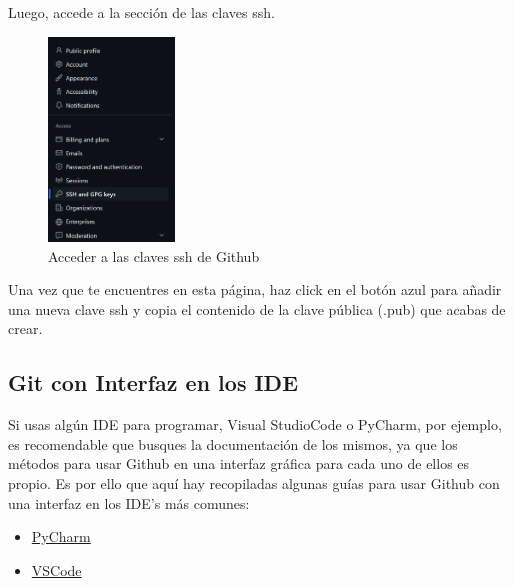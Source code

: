 \documentclass[]{article}
\begin{document}
\begin{enumerate}
    Luego, accede a la sección de las claves ssh.
    \begin{figure}[H]
        \centering
        \includegraphics[width=0.3\textwidth]{./static/github_2.png}
        \caption{Acceder a las claves ssh de Github}
    \end{figure}

    Una vez que te encuentres en esta página, haz click en el botón azul para añadir una nueva clave ssh y copia el contenido de la clave pública (.pub) que acabas de crear.
\end{enumerate}

\subsection{Git con Interfaz en los IDE}
Si usas algún IDE para programar, Visual StudioCode o PyCharm, por ejemplo, es recomendable que busques la documentación de los mismos, ya que los métodos para usar Github en una interfaz gráfica para cada uno de ellos es propio. Es por ello que aquí hay recopiladas algunas guías para usar Github con una interfaz en los IDE's más comunes:

\begin{itemize}
    \item \textcolor{blue}{\href{https://www.jetbrains.com/help/pycharm/github.html}{PyCharm}}
    \item \textcolor{blue}{\href{https://code.visualstudio.com/docs/sourcecontrol/github}{VSCode}}
\end{itemize}
\end{document}

